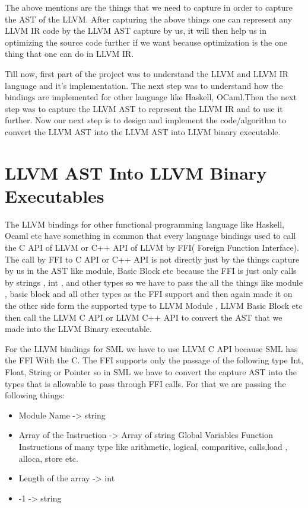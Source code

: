 \documentclass[openany]{book}
\begin{document}
	
	The above mentions are the things that we need to capture in order to capture the AST of the LLVM. After capturing the above things one can represent any LLVM IR code by the LLVM AST capture by us, it will then help us in optimizing the source code further if we want because optimization is the one thing that one can do in LLVM IR.\newline
	
	Till now, first part of the project was to understand the LLVM and LLVM IR language and it's implementation. The next step was to understand how the bindings are implemented for other language like Haskell, OCaml.Then the next step was to capture the LLVM AST to represent the LLVM IR and to use it further. Now our next step is to design and implement the code/algorithm to convert the LLVM AST into the LLVM AST into LLVM binary executable.
	
\chapter{LLVM AST Into LLVM Binary Executables}
The LLVM bindings for other functional programming language like Haskell, Ocaml etc have something in common that every language bindings used to call the C API of LLVM or C++ API of LLVM by FFI( Foreign Function Interface). The call by FFI to C API or C++ API is not directly just by the things capture by us in the AST like module, Basic Block etc  because the FFI is just only calls by strings , int , and other types so we have to pass the all the things like module , basic block and all other types as the FFI support and then again made it on the other side form the supported type to LLVM Module , LLVM Basic Block etc then call the LLVM C API or LLVM C++ API to convert the AST that we made into the LLVM Binary executable.\newline \newline 

For the LLVM bindings for SML we have to use LLVM C API because SML has the FFI With the C. The FFI supports only the passage of the following type Int, Float, String or Pointer so in SML we have to convert the capture AST into the types that is allowable to pass through FFI calls. For that we are passing the following things: \newpage

\begin{itemize}
	\item Module Name  -> string
	\item Array of the Instruction -> Array of string
	\subitem Global Variables   
	\subitem Function 
	\subitem Instructions of many type like arithmetic, logical, comparitive, calls,load , alloca, store etc.
	\item Length of the array -> int 
	\item -1 -> string 
\end{itemize}
	
\end{document}
